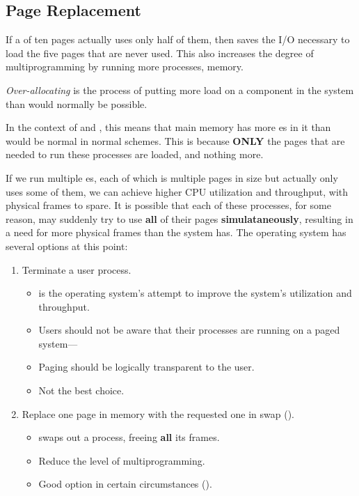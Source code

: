 \subsection{Page Replacement}\label{subsec:Page_Replacement}
If a  of ten pages actually uses only half of them, then  saves the I/O necessary to load the five pages that are never used.
This also increases the degree of multiprogramming by running more processes,  memory.

\begin{definition}\label{def:Over_Allocating}
  \emph{Over-allocating} is the process of putting more load on a component in the system than would normally be possible.

  In the context of  and , this means that main memory has more es in it than would be normal in normal  schemes.
  This is because \textbf{ONLY} the pages that are needed to run these processes are loaded, and nothing more.
\end{definition}

If we run multiple es, each of which is multiple pages in size but actually only uses some of them, we can achieve higher CPU utilization and throughput, with physical frames to spare.
It is possible that each of these processes, for some reason, may suddenly try to use \textbf{all} of their pages \textbf{simulataneously}, resulting in a need for more physical frames than the system has.
The operating system has several options at this point:
\begin{enumerate}[noitemsep]
\item Terminate a user process.
  \begin{itemize}[noitemsep]
  \item {} is the operating system’s attempt to improve the system’s utilization and throughput.
  \item Users should not be aware that their processes are running on a paged system—
  \item Paging should be logically transparent to the user.
  \item Not the best choice.
  \end{itemize}

\item Replace one page in memory with the requested one in swap ().
  \begin{itemize}[noitemsep]
  \item {} swaps out a process, freeing \textbf{all} its frames.
  \item Reduce the level of multiprogramming.
  \item Good option in certain circumstances ().
  \end{itemize}
\end{enumerate}

